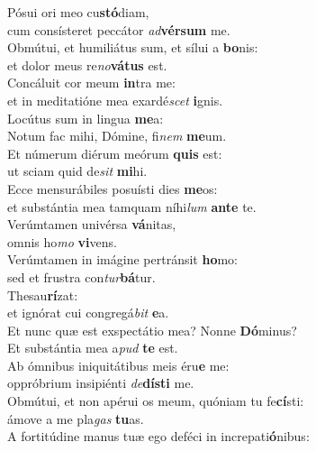 \evenverse Pósui ori meo cu\textbf{stó}diam,~\*\\
\evenverse cum consísteret peccátor \textit{ad}\textbf{vér}\textbf{sum} me.\\
\oddverse Obmútui, et humiliátus sum, et sílui a \textbf{bo}nis:~\*\\
\oddverse et dolor meus re\textit{no}\textbf{vá}\textbf{tus} est.\\
\evenverse Concáluit cor meum \textbf{in}tra me:~\*\\
\evenverse et in meditatióne mea exardé\textit{scet} \textbf{i}gnis.\\
\oddverse Locútus sum in lingua \textbf{me}a:~\*\\
\oddverse Notum fac mihi, Dómine, fi\textit{nem} \textbf{me}um.\\
\evenverse Et númerum diérum meórum \textbf{quis} est:~\*\\
\evenverse ut sciam quid de\textit{sit} \textbf{mi}hi.\\
\oddverse Ecce mensurábiles posuísti dies \textbf{me}os:~\*\\
\oddverse et substántia mea tamquam níhi\textit{lum} \textbf{an}\textbf{te} te.\\
\evenverse Verúmtamen univérsa \textbf{vá}nitas,~\*\\
\evenverse omnis ho\textit{mo} \textbf{vi}vens.\\
\oddverse Verúmtamen in imágine pertránsit \textbf{ho}mo:~\*\\
\oddverse sed et frustra con\textit{tur}\textbf{bá}tur.\\
\evenverse Thesau\textbf{rí}zat:~\*\\
\evenverse et ignórat cui congregá\textit{bit} \textbf{e}a.\\
\oddverse Et nunc quæ est exspectátio mea? Nonne \textbf{Dó}minus?~\*\\
\oddverse Et substántia mea a\textit{pud} \textbf{te} est.\\
\evenverse Ab ómnibus iniquitátibus meis éru\textbf{e} me:~\*\\
\evenverse oppróbrium insipiénti \textit{de}\textbf{dí}\textbf{sti} me.\\
\oddverse Obmútui, et non apérui os meum, quóniam tu fe\textbf{cí}sti:~\*\\
\oddverse ámove a me pla\textit{gas} \textbf{tu}as.\\
\evenverse A fortitúdine manus tuæ ego deféci in increpati\textbf{ó}nibus:~\*\\
